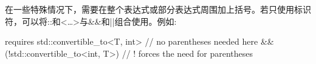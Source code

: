 在一些特殊情况下，需要在整个表达式或部分表达式周围加上括号。若只使用标识符，可以将::和<…>与\&\&和||组合使用。例如:

\begin{cpp}
requires std::convertible_to<T, int> // no parentheses needed here
		&&
		(!std::convertible_to<int, T>) // ! forces the need for parentheses
\end{cpp}


























